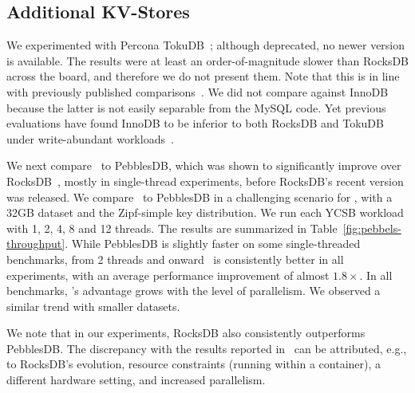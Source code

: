 
\subsection{Additional KV-Stores}
\label{ssec:pebbles} 

We experimented with Percona TokuDB~\cite{TokuDBgit}; although deprecated, no newer version is available. 
The results were at least an order-of-magnitude slower than RocksDB across the board, and therefore we do not present them. 
Note that this is in line with previously published comparisons~\cite{DBLP:conf/cidr/DongCGBSS17,tucana,toku-rocks-inno}.
We did not compare \sys\/  against
InnoDB because the latter is not easily separable 
from the MySQL code. Yet previous evaluations have found  InnoDB to be inferior to both RocksDB and TokuDB under 
write-abundant workloads~\cite{toku-rocks-inno}.

We next compare \sys\ to PebblesDB, which was shown to significantly improve over RocksDB~\cite{PebblesDB},
mostly in single-thread experiments, before RocksDB's recent version was released.  
We compare \sys\ to PebblesDB in a challenging  scenario for \sys, with a 32GB dataset and the Zipf-simple key 
distribution. We run each YCSB workload with 1, 2, 4, 8 and 12 threads. The results are summarized in Table~\ref{fig:pebbels-throughput}. 
While PebblesDB is slightly faster on some single-threaded benchmarks, from 2 threads and onward \sys\ is consistently better in all experiments, 
with an average performance improvement of almost $1.8\times$.  In all benchmarks, 
 \sys's advantage grows with the level of parallelism. We observed a similar trend with smaller datasets. 

We note that in our experiments, RocksDB also consistently outperforms PebblesDB. 
The discrepancy with the results reported in~\cite{PebblesDB} 
can be attributed, e.g., to RocksDB's evolution, resource constraints (running within a 
container), a different hardware setting, and increased  parallelism.   

